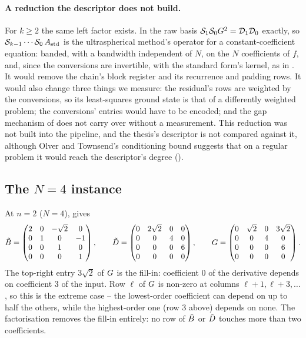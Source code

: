 \paragraph{A reduction the descriptor does not build.} For $k\ge2$ the same left factor exists. In the raw basis $\mathcal{S}_1\mathcal{S}_0G^2=\mathcal{D}_1\mathcal{D}_0$ exactly, so $\mathcal{S}_{k-1}\cdots\mathcal{S}_0\,A_{\mathrm{std}}$ is the ultraspherical method's operator for a constant-coefficient equation: banded, with a bandwidth independent of $N$, on the $N$ coefficients of $f$, and, since the conversions are invertible, with the standard form's kernel, as in . It would remove the chain's block register and its recurrence and padding rows. It would also change three things we measure: the residual's rows are weighted by the conversions, so its least-squares ground state is that of a differently weighted problem; the conversions' entries would have to be encoded; and the gap mechanism of  does not carry over without a measurement. This reduction was not built into the pipeline, and the thesis's descriptor is not compared against it, although Olver and Townsend's conditioning bound suggests that on a regular problem it would reach the descriptor's degree ().

\subsection{The \texorpdfstring{$N = 4$}{N = 4} instance}

At $n = 2$ ($N = 4$),  gives
\begin{equation}
    \tilde{B} =
    \begin{pmatrix}
        2 & 0 & -\sqrt{2} & 0 \\
        0 & 1 & 0 & -1 \\
        0 & 0 & 1 & 0 \\
        0 & 0 & 0 & 1
    \end{pmatrix},
    \qquad
    \tilde{D} =
    \begin{pmatrix}
        0 & 2\sqrt{2} & 0 & 0 \\
        0 & 0 & 4 & 0 \\
        0 & 0 & 0 & 6 \\
        0 & 0 & 0 & 0
    \end{pmatrix},
    \qquad
    G =
    \begin{pmatrix}
        0 & \sqrt{2} & 0 & 3\sqrt{2} \\
        0 & 0 & 4 & 0 \\
        0 & 0 & 0 & 6 \\
        0 & 0 & 0 & 0
    \end{pmatrix}.
\end{equation}
The top-right entry $3\sqrt{2}$ of $G$ is the fill-in: coefficient $0$ of the
derivative depends on coefficient $3$ of the input. Row $\ell$ of $G$ is
non-zero at columns $\ell+1, \ell+3, \dots$, so this is the extreme case --
the lowest-order coefficient can depend on up to half the others, while the
highest-order one (row $3$ above) depends on none. The factorisation removes
the fill-in entirely: no row of $\tilde{B}$ or $\tilde{D}$ touches more than
two coefficients.

